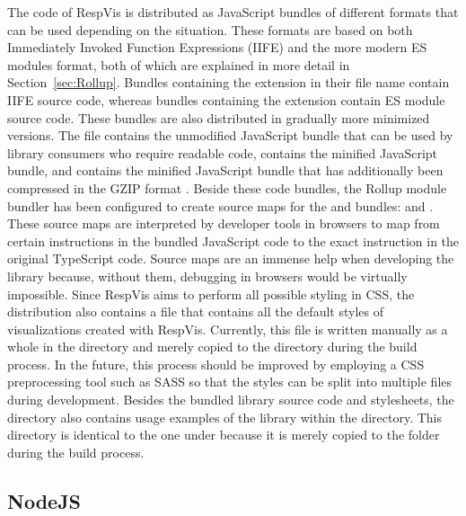 The code of RespVis is distributed as JavaScript bundles of different
formats that can be used depending on the situation.  These formats
are based on both Immediately Invoked Function Expressions (IIFE) and
the more modern ES modules format, both of which are explained in more
detail in Section~\ref{sec:Rollup}.  Bundles containing the 
extension in their file name contain IIFE source code, whereas bundles
containing the  extension contain ES module source code.
These bundles are also distributed in gradually more minimized
versions.  The  file contains the unmodified
JavaScript bundle that can be used by library consumers who require
readable code,  contains the minified
JavaScript bundle, and  contains the
minified JavaScript bundle that has additionally been compressed in
the GZIP format \parencite{GZIP}.  Beside these code bundles, the
Rollup module bundler has been configured to create source maps for
the  and 
bundles:  and
.  These source maps are interpreted
by developer tools in browsers to map from certain instructions in the
bundled JavaScript code to the exact instruction in the original
TypeScript code.  Source maps are an immense help when developing the
library because, without them, debugging in browsers would be
virtually impossible.  Since RespVis aims to perform all possible
styling in CSS, the distribution also contains a
 file that contains all the default styles of
visualizations created with RespVis.  Currently, this file is written
manually as a whole in the  directory and merely copied to
the  directory during the build process.  In the future,
this process should be improved by employing a CSS preprocessing tool
such as SASS \parencite{SASS} so that the styles can be split into
multiple files during development.  Besides the bundled library source
code and stylesheets, the  directory also contains usage
examples of the library within the  directory.
This directory is identical to the one under 
because it is merely copied to the  folder during the
build process.


\subsection{NodeJS}

